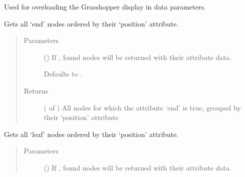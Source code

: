 \documentclass[letterpaper,10pt,english]{sphinxmanual}
\begin{document}
\begin{fulllineitems}
\begin{fulllineitems}
Used for overloading the Grasshopper display in data parameters.

\end{fulllineitems}


\begin{fulllineitems}
\label{\detokenize{cockatoo:cockatoo.KnitNetworkBase.all_ends_by_position}}
Gets all ‘end’ nodes ordered by their ‘position’ attribute.
\begin{quote}\begin{description}
\item[{Parameters}] \leavevmode
{} (\sphinxstyleliteralemphasis{\sphinxupquote{, }}) \textendash{} 
If , found nodes will be returned with their attribute data.

Defaults to .


\item[{Returns}] \leavevmode
{} ( of ) \textendash{} All nodes for which the attribute ‘end’ is true, grouped by their
‘position’ attribute

\end{description}\end{quote}

\end{fulllineitems}


\begin{fulllineitems}
\label{\detokenize{cockatoo:cockatoo.KnitNetworkBase.all_leaves_by_position}}
Gets all ‘leaf’ nodes ordered by their ‘position’ attribute.
\begin{quote}\begin{description}
\item[{Parameters}] \leavevmode
{} (\sphinxstyleliteralemphasis{\sphinxupquote{, }}) \textendash{} 
If , found nodes will be returned with their attribute data.


\end{description}
\end{quote}
\end{fulllineitems}
\end{fulllineitems}
\end{document}
